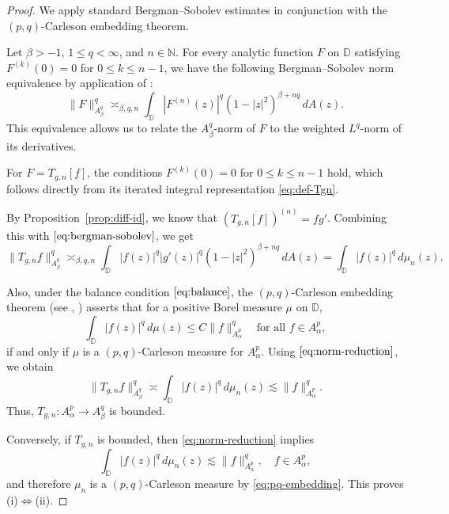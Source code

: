\documentclass[preprint,12pt]{elsarticle}
\numberwithin{equation}{section}
\theoremstyle{remark}
\begin{document}
\begin{proof}
We apply standard Bergman--Sobolev estimates in conjunction with the $(p,q)$-Carleson embedding theorem.

Let $ \beta > -1 $, $ 1 \le q < \infty $, and $ n \in \mathbb{N} $. For every analytic function $ F $ on $ \mathbb{D} $ satisfying $ F^{(k)}(0) = 0 $ for $ 0 \leq k \leq n-1 $, we have the following Bergman--Sobolev norm equivalence by application of  \cite[Proposition 6.2]{Zhu2005}:
\begin{equation}\label{eq:bergman-sobolev}
\|F\|_{A_\beta^q}^q \asymp_{\beta, q, n} \int_{\mathbb{D}} |F^{(n)}(z)|^q (1 - |z|^2)^{\beta + nq} \, dA(z).
\end{equation}
This equivalence allows us to relate the $ A_\beta^q $-norm of $ F $ to the weighted $ L^q $-norm of its derivatives.

For $ F = T_{g,n}[f] $, the conditions $ F^{(k)}(0) = 0 $ for $ 0 \leq k \leq n-1 $ hold, which follows directly from its iterated integral representation \eqref{eq:def-Tgn}.

By Proposition~\ref{prop:diff-id}, we know that $ (T_{g,n}[f])^{(n)} = f  g' $. Combining this with $\eqref{eq:bergman-sobolev}$, we get
\begin{equation}\label{eq:norm-reduction}
\|T_{g,n}f\|_{A_\beta^q}^q \asymp_{\beta, q, n} \int_{\mathbb{D}} |f(z)|^q |g'(z)|^q (1 - |z|^2)^{\beta + nq} \, dA(z)
= \int_{\mathbb{D}} |f(z)|^q \, d\mu_n(z).
\end{equation}

Also, under the balance condition $\eqref{eq:balance}$, the $(p,q)$-Carleson embedding theorem (see \cite[p. 4]{Dya}, \cite{Hastings1975}) asserts that for a positive Borel measure $ \mu $ on $ \mathbb{D} $,
\begin{equation}\label{eq:pq-embedding}
\int_{\mathbb{D}} |f(z)|^q \, d\mu(z) \le C \|f\|_{A_\alpha^p}^q \quad \text{for all } f \in A_\alpha^p,
\end{equation}
if and only if $ \mu $ is a $(p,q)$-Carleson measure for $ A_\alpha^p $. Using $\eqref{eq:norm-reduction}$, we obtain
\begin{equation*}
\|T_{g,n}f\|_{A_\beta^q}^q \asymp \int_{\mathbb{D}} |f(z)|^q \, d\mu_n(z) \lesssim \|f\|_{A_\alpha^p}^q.
\end{equation*}
Thus, $ T_{g,n} : A_\alpha^p \to A_\beta^q $ is bounded.

Conversely, if $T_{g,n}$ is bounded, then \eqref{eq:norm-reduction} implies
\begin{equation*}
\int_{\mathbb D} |f(z)|^q\,d\mu_n(z) \lesssim \|f\|_{A_\alpha^p}^q,
\quad f\in A_\alpha^p,
\end{equation*}
and therefore $\mu_n$ is a $(p,q)$-Carleson measure by \eqref{eq:pq-embedding}.
This proves (i)$\Leftrightarrow$(ii).


\end{proof}
\end{document}
